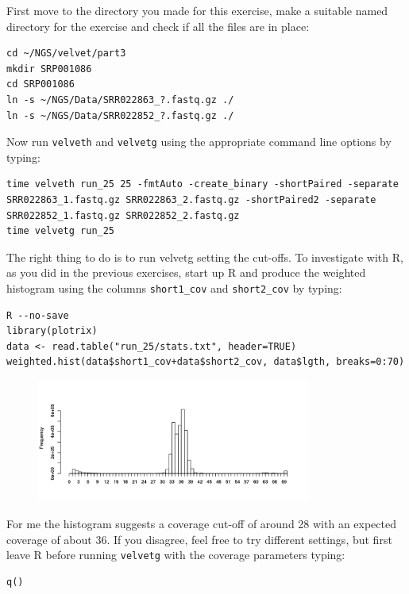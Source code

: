 \begin{steps}
First move to the directory you made for this exercise, make a suitable named
directory for the exercise and check if all the files are in place:
\begin{lstlisting}
cd ~/NGS/velvet/part3
mkdir SRP001086
cd SRP001086
ln -s ~/NGS/Data/SRR022863_?.fastq.gz ./
ln -s ~/NGS/Data/SRR022852_?.fastq.gz ./
\end{lstlisting}

Now run \texttt{velveth} and \texttt{velvetg} using the appropriate command line
options by typing:
\begin{lstlisting}
time velveth run_25 25 -fmtAuto -create_binary -shortPaired -separate SRR022863_1.fastq.gz SRR022863_2.fastq.gz -shortPaired2 -separate SRR022852_1.fastq.gz SRR022852_2.fastq.gz
time velvetg run_25
\end{lstlisting}

The right thing to do is to run velvetg setting the cut-offs. To investigate
with R, as you did in the previous exercises, start up R and produce the
weighted histogram using the columns \texttt{short1\_cov} and
\texttt{short2\_cov} by typing:
\begin{lstlisting}[style=R]
R --no-save
library(plotrix) 
data <- read.table("run_25/stats.txt", header=TRUE) 
weighted.hist(data$short1_cov+data$short2_cov, data$lgth, breaks=0:70)
\end{lstlisting}

\begin{figure}[H]
\centering
\includegraphics[width=0.8\textwidth]{handout/velvet/velvet_Rplot004.png}
\caption{\label{fig:velvet_Rplot004}}
\end{figure}

For me the histogram suggests a coverage cut-off of around 28
with an expected coverage of about 36. If you disagree, feel free to try
different settings, but first leave R before running \texttt{velvetg} with the coverage
parameters typing:
\begin{lstlisting}[style=R]
q()
\end{lstlisting}


\end{steps}
